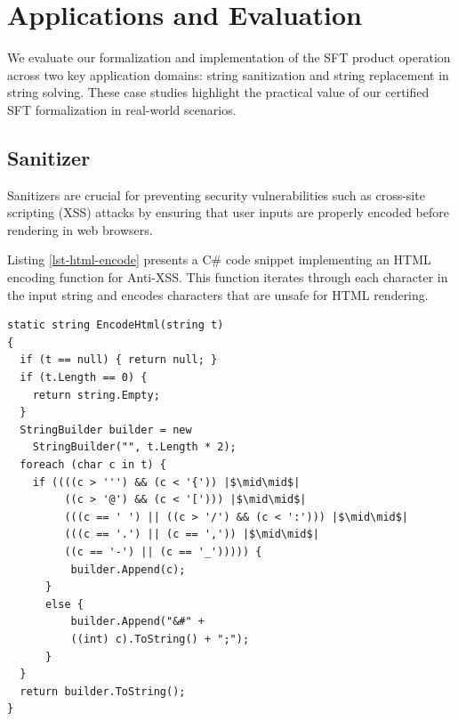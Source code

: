 \section{Applications and Evaluation}
\label{sec:application}
We evaluate our formalization and implementation of the SFT product operation across two key application domains: string sanitization and string replacement in string solving. These case studies highlight the practical value of our certified SFT formalization in real-world scenarios.
\subsection{Sanitizer}

Sanitizers are crucial for preventing security vulnerabilities such as cross-site scripting (XSS) attacks by ensuring that user inputs are properly encoded before rendering in web browsers.

Listing \ref{lst-html-encode} presents a C\# code snippet implementing an HTML encoding function for Anti-XSS. This function iterates through each character in the input string and encodes characters that are unsafe for HTML rendering.



\begin{lstlisting}[language={[Sharp]C}, caption={C\# Code for AntiXSS.EncodeHtml version 2.0.}, label={lst-html-encode}, float=htbp]
static string EncodeHtml(string t)
{
  if (t == null) { return null; }
  if (t.Length == 0) {
    return string.Empty;
  }
  StringBuilder builder = new
    StringBuilder("", t.Length * 2);
  foreach (char c in t) {
    if ((((c > ''') && (c < '{')) |$\mid\mid$|
         ((c > '@') && (c < '['))) |$\mid\mid$|
         (((c == ' ') || ((c > '/') && (c < ':'))) |$\mid\mid$|
         (((c == '.') || (c == ',')) |$\mid\mid$|
         ((c == '-') || (c == '_'))))) {
          builder.Append(c);
      }
      else {
          builder.Append("&#" +
          ((int) c).ToString() + ";");
      }
  }
  return builder.ToString();
}
\end{lstlisting}

